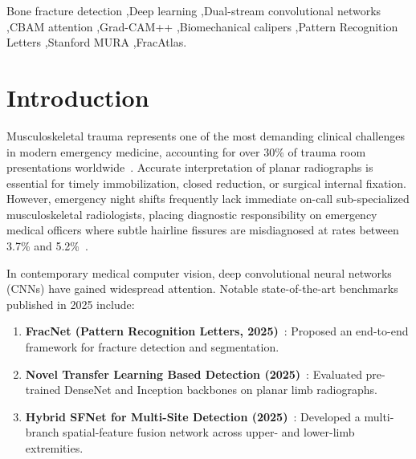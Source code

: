 \documentclass[3p,twocolumn]{elsarticle}
\begin{document}
\begin{frontmatter}
\begin{keyword}
Bone fracture detection \sep Deep learning \sep Dual-stream convolutional networks \sep CBAM attention \sep Grad-CAM++ \sep Biomechanical calipers \sep Pattern Recognition Letters \sep Stanford MURA \sep FracAtlas.
\end{keyword}

\end{frontmatter}

\section{Introduction}
Musculoskeletal trauma represents one of the most demanding clinical challenges in modern emergency medicine, accounting for over 30\% of trauma room presentations worldwide~\cite{rajpurkar2017mura}. Accurate interpretation of planar radiographs is essential for timely immobilization, closed reduction, or surgical internal fixation. However, emergency night shifts frequently lack immediate on-call sub-specialized musculoskeletal radiologists, placing diagnostic responsibility on emergency medical officers where subtle hairline fissures are misdiagnosed at rates between 3.7\% and 5.2\%~\cite{fracatlas2023}.

In contemporary medical computer vision, deep convolutional neural networks (CNNs) have gained widespread attention. Notable state-of-the-art benchmarks published in 2025 include:
\begin{enumerate}
    \item \textbf{FracNet (Pattern Recognition Letters, 2025)}~\cite{fracnet2025}: Proposed an end-to-end framework for fracture detection and segmentation.
    \item \textbf{Novel Transfer Learning Based Detection (2025)}~\cite{noveltransfer2025}: Evaluated pre-trained DenseNet and Inception backbones on planar limb radiographs.
    \item \textbf{Hybrid SFNet for Multi-Site Detection (2025)}~\cite{sfnet2025}: Developed a multi-branch spatial-feature fusion network across upper- and lower-limb extremities.
\end{enumerate}
\end{document}
